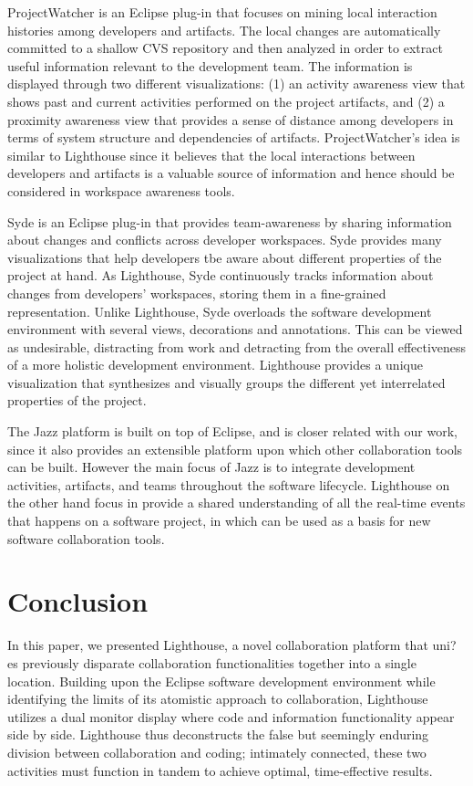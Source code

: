 \documentclass[10pt, conference, compsocconf]{IEEEtran}
\begin{document}
ProjectWatcher \cite{schneider04interaction} is an Eclipse plug-in that focuses on mining local interaction histories among developers and artifacts. The local changes are automatically committed to a shallow CVS repository and then analyzed in order to extract useful information relevant to the development team. The information is displayed through two different visualizations: (1) an activity awareness view that shows past and current activities performed on the project artifacts, and (2) a proximity awareness view that provides a sense of distance among developers in terms of system structure and dependencies of artifacts. ProjectWatcher's idea is similar to Lighthouse since it believes that the local interactions between developers and artifacts is a valuable source of information and hence should be considered in workspace awareness tools.

Syde \cite{Hattori:2010} is an Eclipse plug-in that provides team-awareness by sharing information about changes and conflicts across developer workspaces. Syde provides many visualizations that help developers tbe aware about different properties of the project at hand. As Lighthouse, Syde continuously tracks information about changes from developers' workspaces, storing them in a fine-grained representation. Unlike Lighthouse, Syde overloads the software development environment with several views, decorations and annotations. This can be viewed as undesirable, distracting from work and detracting from the overall effectiveness of a more holistic development environment. Lighthouse provides a unique visualization that synthesizes and visually groups the different yet interrelated properties of the project.

The Jazz platform \cite{Cheng:2003}  is built on top of Eclipse, and is closer related with our work, since it also provides an extensible platform upon which other collaboration tools can be built. However the main focus of Jazz is to integrate development activities, artifacts, and teams throughout the software lifecycle. Lighthouse on the other hand focus in provide a shared understanding of all the real-time events that happens on a software project, in which can be used as a basis for new software collaboration tools.

\section{Conclusion}
In this paper, we presented Lighthouse, a novel collaboration platform that uni?es previously disparate collaboration functionalities together into a single location. Building upon the Eclipse software development environment while identifying the limits of its atomistic approach to collaboration, Lighthouse utilizes a dual monitor display where code and information functionality appear side by side.  Lighthouse thus deconstructs the false but seemingly enduring division between collaboration and coding; intimately connected, these two activities must function in tandem to achieve optimal, time-effective results.  
\end{document}
